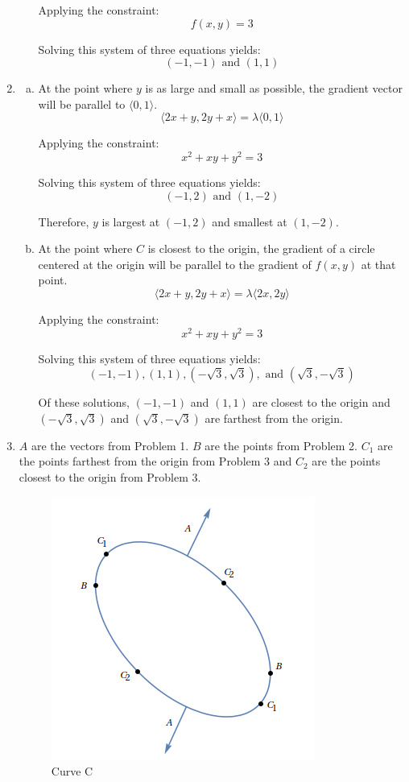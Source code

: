 \documentclass{article}
\begin{document}
\begin{enumerate}[1.]
\begin{enumerate}[a.]
        Applying the constraint:
        $$ f(x, y) = 3 $$

        Solving this system of three equations yields:
        $$ (-1, -1) \textrm{ and } (1, 1) $$
    \end{enumerate}
  \item \begin{enumerate}[a.]
      \item At the point where $y$ is as large and small as possible, the
        gradient vector will be parallel to $\langle 0, 1 \rangle$.
        $$ \langle 2x + y, 2y + x \rangle = \lambda \langle 0, 1 \rangle $$

        Applying the constraint:
        $$ x^{2} + xy + y^{2} = 3 $$

        Solving this system of three equations yields:
        $$ (-1, 2) \textrm{ and } (1, -2) $$

        Therefore, $y$ is largest at $(-1, 2)$ and smallest at $(1, -2)$.

      \item At the point where $C$ is closest to the origin, the gradient of a
        circle centered at the origin will be parallel to the gradient of $f(x,
        y)$ at that point.
        $$ \langle 2x + y, 2y + x \rangle = \lambda \langle 2x, 2y \rangle$$

        Applying the constraint:
        $$ x^{2} + xy + y^{2} = 3 $$

        Solving this system of three equations yields:
        $$ (-1, -1), (1, 1), (-\sqrt{3}, \sqrt{3}), \textrm{ and } (\sqrt{3},
        -\sqrt{3}) $$

        Of these solutions, $(-1, -1)$ and $(1, 1)$ are closest to the origin and
        $(-\sqrt{3}, \sqrt{3})$ and $(\sqrt{3},-\sqrt{3})$ are farthest from the
        origin.
    \end{enumerate}
  \item $A$ are the vectors from Problem 1. $B$ are the points from Problem 2.
    $C_{1}$ are the points farthest from the origin from Problem 3 and $C_{2}$
    are the points closest to the origin from Problem 3.

    \begin{figure}[H]
      \centering
      \includegraphics[scale=0.50]{"CurveC"}
      \caption{Curve C}
    \end{figure}


\end{enumerate}
\end{document}

